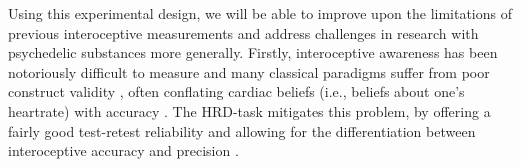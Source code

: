 \documentclass{article}
\begin{document}
Using this experimental design, we will be able to improve upon the limitations of previous interoceptive measurements and address challenges in research with psychedelic substances more generally.
Firstly, interoceptive awareness has been notoriously difficult to measure and many classical paradigms suffer from poor construct validity \parencite{desmedt2018heartbeat, desmedt2020review}, often conflating cardiac beliefs (i.e., beliefs about one's heartrate) with accuracy \parencite{windmann1999dissociating}. 
The HRD-task mitigates this problem, by offering a fairly good test-retest reliability and allowing for the differentiation between interoceptive accuracy and precision \parencite{legrand2022heart}. %
\begin{comment}
Secondly, psilocybin induces cognitive-attentional deficits, a major hurdle for cognitive assessments under its influence \parencite{carter2005att-wm-1a2a, quednow2012inhibition-deficits, barrett2018psidxm} and its subjective effects enable participants to correctly guess their experimental condition, causing de-blinding \parencite{muthukumaraswamy2021blinding}. 
In light these issues, we will take advantage of an exteroceptive control condition, which allows us to disentangle whether alterations in response precision are specific to interoceptive signals or more general, for example resulting from attentional or cognitive deficits. 
Moreover, in line with hypothesis 2, we expect that these deficits will affect response precision and thus be captured in the slope, rather than in the threshold of the underlying sigmoidal curve. Thus, by both focusing on the threshold as the primary outcome measure and controlling for cognitive-attentional deficits with the exteroceptive control condition, we will be able to ameliorate this problem. 
Lastly, by using doses in the low-to mid range, we further minimize the risk of psilocybin-induced attentional deficits. The differences between doses will be sufficiently small to reduce the participants’ and researchers’ ability to correctly guess their condition, thereby ameliorating the problem of breaking blind.
\end{comment}
\end{document}
